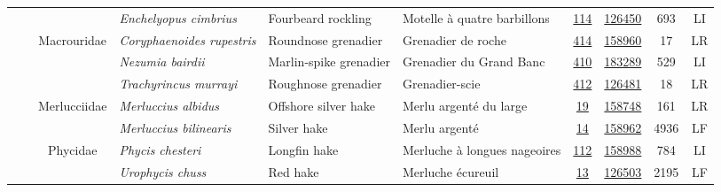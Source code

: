 \documentclass[12pt]{article}\usepackage[]{graphicx}\usepackage[]{color}
\begin{document}
\begin{landscapepage}
\begin{longtable}[t]{ccc>{\centering\arraybackslash}p{3cm}>{\centering\arraybackslash}p{3cm}>{\centering\arraybackslash}p{3cm}>{}c>{}ccc}
\hspace{1em}\hspace{1em} &  &  & \em{Enchelyopus cimbrius} & Fourbeard rockling & Motelle à quatre barbillons & \href{#sec:114}{114} & \href{http://www.marinespecies.org/aphia.php?p=taxdetails&id=126450}{126450} & 693 & LI\\
\hspace{1em}\hspace{1em} &  & Macrouridae & \em{Coryphaenoides rupestris} & Roundnose grenadier & Grenadier de roche & \href{#sec:414}{414} & \href{http://www.marinespecies.org/aphia.php?p=taxdetails&id=158960}{158960} & 17 & LR\\
\hspace{1em}\hspace{1em} &  &  & \em{Nezumia bairdii} & Marlin-spike grenadier & Grenadier du Grand Banc & \href{#sec:410}{410} & \href{http://www.marinespecies.org/aphia.php?p=taxdetails&id=183289}{183289} & 529 & LI\\
\hspace{1em}\hspace{1em} &  &  & \em{Trachyrincus murrayi} & Roughnose grenadier & Grenadier-scie & \href{#sec:412}{412} & \href{http://www.marinespecies.org/aphia.php?p=taxdetails&id=126481}{126481} & 18 & LR\\
\hspace{1em}\hspace{1em} &  & Merlucciidae & \em{Merluccius albidus} & Offshore silver hake & Merlu argenté du large & \href{#sec:19}{19} & \href{http://www.marinespecies.org/aphia.php?p=taxdetails&id=158748}{158748} & 161 & LR\\
\hspace{1em}\hspace{1em} &  &  & \em{Merluccius bilinearis} & Silver hake & Merlu argenté & \href{#sec:14}{14} & \href{http://www.marinespecies.org/aphia.php?p=taxdetails&id=158962}{158962} & 4936 & LF\\
\hspace{1em}\hspace{1em} &  & Phycidae & \em{Phycis chesteri} & Longfin hake & Merluche à longues nageoires & \href{#sec:112}{112} & \href{http://www.marinespecies.org/aphia.php?p=taxdetails&id=158988}{158988} & 784 & LI\\
\hspace{1em}\hspace{1em} &  &  & \em{Urophycis chuss} & Red hake & Merluche écureuil & \href{#sec:13}{13} & \href{http://www.marinespecies.org/aphia.php?p=taxdetails&id=126503}{126503} & 2195 & LF\\

\end{longtable}
\end{landscapepage}
\end{document}
